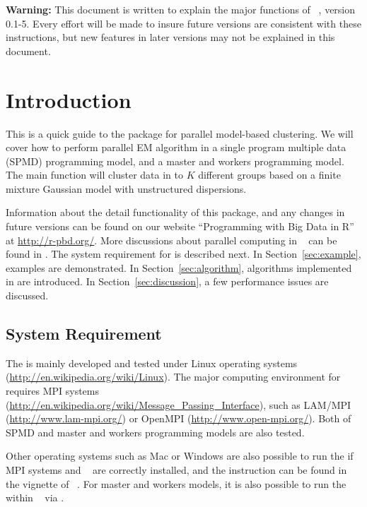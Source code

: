 
{\color{red} \bf Warning:} This document is written to explain the major
functions of
~\citep{Chen2012pmclustpackage}, version 0.1-5.
Every effort will be made to insure future versions are consistent with
these instructions, but new features in later versions may not be explained
in this document.


\section[Introduction]{Introduction}
\label{sec:introduction}

This is a quick guide to the package  for
parallel model-based clustering.
We will cover how to perform parallel EM algorithm in 
a single program multiple data (SPMD) programming model,
and a master and workers programming model.
The main function  will cluster
data in to $K$ different groups based on a finite mixture Gaussian
model with unstructured dispersions.

Information about the detail functionality of this package,
and any changes in future versions can be found on our website
``Programming with Big Data in R'' at
\url{http://r-pbd.org/}.
More discussions about parallel computing in ~\citep{Rcore}
can be found in \citet{Schmidberger2009}.
The system requirement for  is described next.
In Section~\ref{sec:example}, examples are demonstrated.
In Section~\ref{sec:algorithm}, algorithms implemented in 
are introduced. In Section~\ref{sec:discussion}, a few performance issues
are discussed.




\subsection[System Requirement]{System Requirement}
\label{sec:system_requirement}

The  is mainly developed and tested under Linux operating systems
(\url{http://en.wikipedia.org/wiki/Linux}).
The major computing environment for  requires MPI systems
(\url{http://en.wikipedia.org/wiki/Message_Passing_Interface}), such as
LAM/MPI (\url{http://www.lam-mpi.org/}) or
OpenMPI (\url{http://www.open-mpi.org/}).
Both of SPMD and master and workers programming models are also tested.

Other operating systems such as Mac or Windows are also possible to run the
 if MPI systems and ~\citep{Chen2012pbdMPIpackage}
are correctly installed, and the instruction can be found in
the vignette of ~\citep{Chen2012pbdMPIvignette}.
For master and workers models,
it is also possible to run the  within ~\citep{Yu2010}
via .

